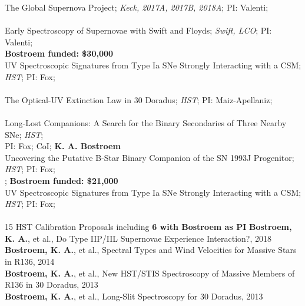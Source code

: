 \documentclass[10pt]{cv}
\begin{document}
\begin{llist}
The Global Supernova Project; {\it Keck, 2017A, 2017B, 2018A}; PI: Valenti; \\
\hspace*{24pt}{\bf CoI: K. A. Bostroem} \\
Early Spectroscopy of Supernovae with Swift and Floyds; {\it Swift, LCO}; PI: Valenti; \\
\hspace*{24pt} {\bf Bostroem funded: \$30,000} \\
UV Spectroscopic Signatures from Type Ia SNe Strongly Interacting with a CSM; {\it HST}; PI: Fox; \\
\hspace*{24pt}{\bf CoI: K. A. Bostroem} \\
The Optical-UV Extinction Law in 30 Doradus; {\it HST}; PI: Maiz-Apellaniz; \\
 \hspace*{24pt}{\bf Admin PI: K. A. Bostroem; Bostroem funded: \$58,500} \\
Long-Lost Companions: A Search for the Binary Secondaries of Three Nearby SNe; {\it HST}; \\
\hspace*{24pt}PI: Fox; CoI; {\bf K. A. Bostroem} \\
Uncovering the Putative B-Star Binary Companion of the SN 1993J Progenitor; {\it HST}; PI: Fox; \\
\hspace*{24pt}{\bf CoI: K. A. Bostroem}; {\bf Bostroem funded: \$21,000} \\
UV Spectroscopic Signatures from Type Ia SNe Strongly Interacting with a CSM; {\it HST}; PI: Fox; \\
\hspace*{24pt}{\bf CoI: K. A. Bostroem}  \\
15 HST Calibration Proposals including {\bf 6 with Bostroem as PI}
%
\vspace{-0.1in}   
{\bf Bostroem, K. A.}, et al., Do Type IIP/IIL Supernovae Experience Interaction?, 2018\\
{\bf Bostroem, K. A.}, et al., Spectral Types and Wind Velocities for Massive Stars in R136, 2014\\
{\bf Bostroem, K. A.}, et al., New HST/STIS Spectroscopy of Massive Members of R136 in 30 Doradus, 2013\\
{\bf Bostroem, K. A.}, et al., Long-Slit Spectroscopy for 30 Doradus, 2013\\

\end{llist}
\end{document}
